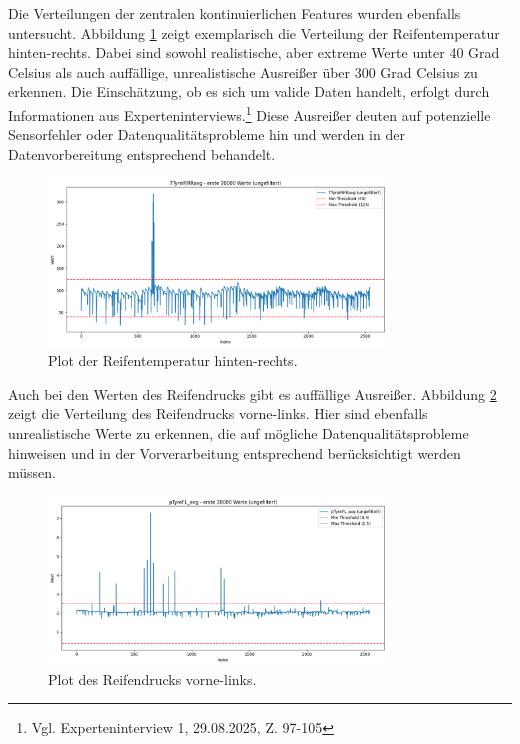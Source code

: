 Die Verteilungen der zentralen kontinuierlichen Features wurden ebenfalls untersucht. Abbildung \ref{fig:temp_distribution} zeigt exemplarisch die Verteilung der Reifentemperatur hinten-rechts. Dabei sind sowohl realistische, aber extreme Werte unter 40 Grad Celsius als auch auffällige, unrealistische Ausreißer über 300 Grad Celsius zu erkennen. Die Einschätzung, ob es sich um valide Daten handelt, erfolgt durch Informationen aus Experteninterviews.\footnote{Vgl. Experteninterview 1, 29.08.2025, Z. 97-105} Diese Ausreißer deuten auf potenzielle Sensorfehler oder Datenqualitätsprobleme hin und werden in der Datenvorbereitung entsprechend behandelt.
\begin{figure}[H]
  \centering
  \includegraphics[width=0.8\textwidth]{graphics/TempPlot.png}
  \caption{Plot der Reifentemperatur hinten-rechts.}
  \label{fig:temp_distribution}
\end{figure}

Auch bei den Werten des Reifendrucks gibt es auffällige Ausreißer. Abbildung \ref{fig:druck_distribution} zeigt die Verteilung des Reifendrucks vorne-links. Hier sind ebenfalls unrealistische Werte zu erkennen, die auf mögliche Datenqualitätsprobleme hinweisen und in der Vorverarbeitung entsprechend berücksichtigt werden müssen.
\begin{figure}[H]
  \centering
  \includegraphics[width=0.8\textwidth]{graphics/DruckPlot.png}
  \caption{Plot des Reifendrucks vorne-links.}
  \label{fig:druck_distribution}
\end{figure}

